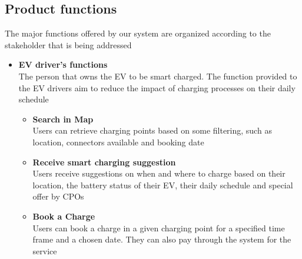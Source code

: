 \subsection{Product functions}
The major functions offered by our system are organized according to the stakeholder that is being addressed
\begin{itemize}
      \item \textbf{EV driver's functions}\\
            The person that owns the EV to be smart charged. The function provided to the EV drivers aim to reduce the impact of charging processes on their daily schedule
            \begin{itemize}
                  \item \textbf{Search in Map}\\
                        Users can retrieve charging points based on some filtering, such as location, connectors available and booking date
                  \item \textbf{Receive smart charging suggestion}\\
                        Users receive suggestions on when and where to charge based on their location, the battery status of their EV, their daily schedule and special offer by CPOs
                  \item \textbf{Book a Charge}\\
                        Users can book a charge in a given charging point for a specified time frame and a chosen date. They can also pay through the system for the service
            \end{itemize}
\end{itemize}
